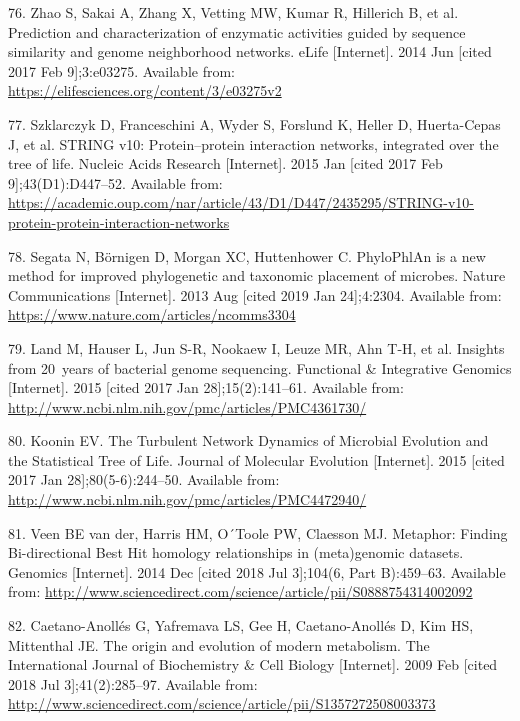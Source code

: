 \documentclass[12pt,twoside]{reedthesis}
\begin{document}
  \hypertarget{ref-zhao__function_prediction_neighbourhood_2014}{}
  76. Zhao S, Sakai A, Zhang X, Vetting MW, Kumar R, Hillerich B, et al.
  Prediction and characterization of enzymatic activities guided by
  sequence similarity and genome neighborhood networks. eLife
  {[}Internet{]}. 2014 Jun {[}cited 2017 Feb 9{]};3:e03275. Available
  from: \url{https://elifesciences.org/content/3/e03275v2}
  
  \hypertarget{ref-szklarczyk_string_2015}{}
  77. Szklarczyk D, Franceschini A, Wyder S, Forslund K, Heller D,
  Huerta-Cepas J, et al. STRING v10: Protein--protein interaction
  networks, integrated over the tree of life. Nucleic Acids Research
  {[}Internet{]}. 2015 Jan {[}cited 2017 Feb 9{]};43(D1):D447--52.
  Available from:
  \url{https://academic.oup.com/nar/article/43/D1/D447/2435295/STRING-v10-protein-protein-interaction-networks}
  
  \hypertarget{ref-segata_phylophlan_2013}{}
  78. Segata N, Börnigen D, Morgan XC, Huttenhower C. PhyloPhlAn is a new
  method for improved phylogenetic and taxonomic placement of microbes.
  Nature Communications {[}Internet{]}. 2013 Aug {[}cited 2019 Jan
  24{]};4:2304. Available from:
  \url{https://www.nature.com/articles/ncomms3304}
  
  \hypertarget{ref-land_insights_2015}{}
  79. Land M, Hauser L, Jun S-R, Nookaew I, Leuze MR, Ahn T-H, et al.
  Insights from 20~years of bacterial genome sequencing. Functional \&
  Integrative Genomics {[}Internet{]}. 2015 {[}cited 2017 Jan
  28{]};15(2):141--61. Available from:
  \url{http://www.ncbi.nlm.nih.gov/pmc/articles/PMC4361730/}
  
  \hypertarget{ref-koonin_turbulent_2015}{}
  80. Koonin EV. The Turbulent Network Dynamics of Microbial Evolution and
  the Statistical Tree of Life. Journal of Molecular Evolution
  {[}Internet{]}. 2015 {[}cited 2017 Jan 28{]};80(5-6):244--50. Available
  from: \url{http://www.ncbi.nlm.nih.gov/pmc/articles/PMC4472940/}
  
  \hypertarget{ref-van_der_veen_metaphor_2014}{}
  81. Veen BE van der, Harris HM, O´Toole PW, Claesson MJ. Metaphor:
  Finding Bi-directional Best Hit homology relationships in (meta)genomic
  datasets. Genomics {[}Internet{]}. 2014 Dec {[}cited 2018 Jul
  3{]};104(6, Part B):459--63. Available from:
  \url{http://www.sciencedirect.com/science/article/pii/S0888754314002092}
  
  \hypertarget{ref-caetano-anolles_origin_metabolism_2009}{}
  82. Caetano-Anollés G, Yafremava LS, Gee H, Caetano-Anollés D, Kim HS,
  Mittenthal JE. The origin and evolution of modern metabolism. The
  International Journal of Biochemistry \& Cell Biology {[}Internet{]}.
  2009 Feb {[}cited 2018 Jul 3{]};41(2):285--97. Available from:
  \url{http://www.sciencedirect.com/science/article/pii/S1357272508003373}
  
\end{document}
